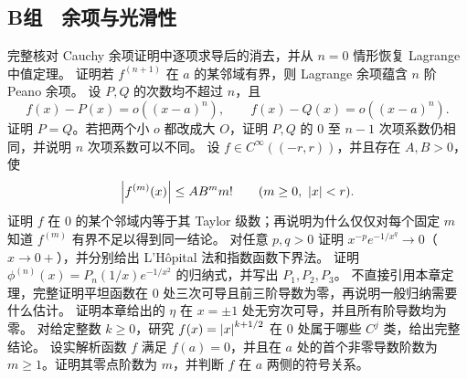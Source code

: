 \subsection*{B组　余项与光滑性}
\begin{enumerate}[label=\textbf{\thechapter.\arabic*.},resume]
  完整核对 Cauchy 余项证明中逐项求导后的消去，并从 \(n=0\) 情形恢复 Lagrange 中值定理。
  证明若 \(f^{(n+1)}\) 在 \(a\) 的某邻域有界，则 Lagrange 余项蕴含 \(n\) 阶 Peano 余项。
  设 \(P,Q\) 的次数均不超过 \(n\)，且
 \[
  f(x)-P(x)=o((x-a)^n),\qquad f(x)-Q(x)=o((x-a)^n).
 \]
 证明 \(P=Q\)。若把两个小 \(o\) 都改成大 \(O\)，证明 \(P,Q\) 的 \(0\) 至 \(n-1\) 次项系数仍相同，并说明 \(n\) 次项系数可以不同。
  设 \(f\in C^\infty((-r,r))\)，并且存在 \(A,B>0\)，使
 \[
  \abs{f^{(m)}(x)}\le AB^m m!\qquad(m\ge0,\ \abs x<r).
 \]
 证明 \(f\) 在 \(0\) 的某个邻域内等于其 Taylor 级数；再说明为什么仅仅对每个固定 \(m\) 知道 \(f^{(m)}\) 有界不足以得到同一结论。
  对任意 \(p,q>0\) 证明 \(x^{-p}e^{-1/x^q}\to0\)（\(x\to0+\)），并分别给出 L'Hôpital 法和指数函数下界法。
  证明 \(\phi^{(n)}(x)=P_n(1/x)e^{-1/x^2}\) 的归纳式，并写出 \(P_1,P_2,P_3\)。
  不直接引用本章定理，完整证明平坦函数在 \(0\) 处三次可导且前三阶导数为零，再说明一般归纳需要什么估计。
  证明本章给出的 \(\eta\) 在 \(x=\pm1\) 处无穷次可导，并且所有阶导数均为零。
  对给定整数 \(k\ge0\)，研究 \(f(x)=\left|x\right|^{k+1/2}\) 在 \(0\) 处属于哪些 \(C^j\) 类，给出完整结论。
  设实解析函数 \(f\) 满足 \(f(a)=0\)，并且在 \(a\) 处的首个非零导数阶数为 \(m\ge1\)。证明其零点阶数为 \(m\)，并判断 \(f\) 在 \(a\) 两侧的符号关系。
\end{enumerate}

